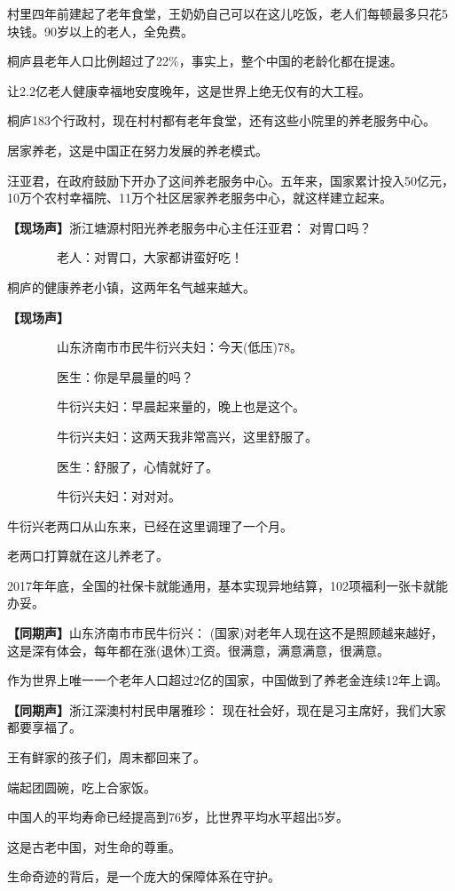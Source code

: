 \documentclass{ctexart}
\newcommand{\zkh}[1]{\textbf{\hspace{-2.7em} 【#1】}}
\begin{document}
 
村里四年前建起了老年食堂，王奶奶自己可以在这儿吃饭，老人们每顿最多只花5块钱。90岁以上的老人，全免费。

 桐庐县老年人口比例超过了22{\%}，事实上，整个中国的老龄化都在提速。

 让2.2亿老人健康幸福地安度晚年，这是世界上绝无仅有的大工程。

 桐庐183个行政村，现在村村都有老年食堂，还有这些小院里的养老服务中心。

 居家养老，这是中国正在努力发展的养老模式。

汪亚君，在政府鼓励下开办了这间养老服务中心。五年来，国家累计投入50亿元，10万个农村幸福院、11万个社区居家养老服务中心，就这样建立起来。

 \zkh{现场声}浙江塘源村阳光养老服务中心主任汪亚君： 对胃口吗？

 　　　　老人：对胃口，大家都讲蛮好吃！

 桐庐的健康养老小镇，这两年名气越来越大。

 \zkh{现场声}
 
 　　　　山东济南市市民牛衍兴夫妇：今天(低压)78。

 　　　　医生：你是早晨量的吗？

 　　　　牛衍兴夫妇：早晨起来量的，晚上也是这个。

 　　　　牛衍兴夫妇：这两天我非常高兴，这里舒服了。

 　　　　医生：舒服了，心情就好了。

 　　　　牛衍兴夫妇：对对对。

 牛衍兴老两口从山东来，已经在这里调理了一个月。

 老两口打算就在这儿养老了。

2017年年底，全国的社保卡就能通用，基本实现异地结算，102项福利一张卡就能办妥。

 \zkh{同期声}山东济南市市民牛衍兴： (国家)对老年人现在这不是照顾越来越好，这是深有体会，每年都在涨(退休)工资。很满意，满意满意，很满意。

 
作为世界上唯一一个老年人口超过2亿的国家，中国做到了养老金连续12年上调。

 \zkh{同期声}浙江深澳村村民申屠雅珍： 现在社会好，现在是习主席好，我们大家都要享福了。

 王有鲜家的孩子们，周末都回来了。

 端起团圆碗，吃上合家饭。

 中国人的平均寿命已经提高到76岁，比世界平均水平超出5岁。

 这是古老中国，对生命的尊重。

 生命奇迹的背后，是一个庞大的保障体系在守护。
\end{document}
